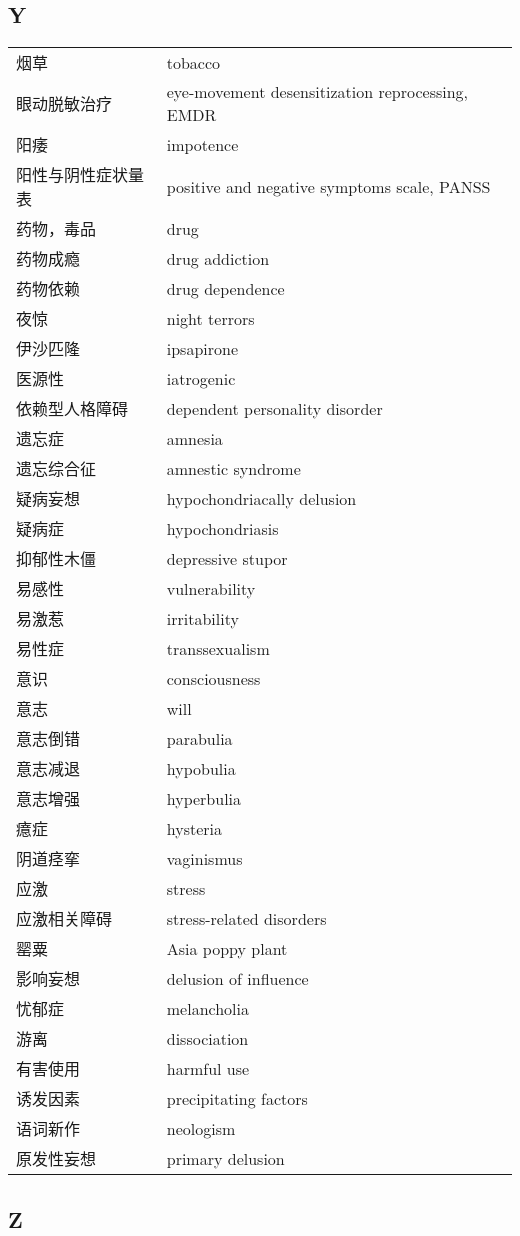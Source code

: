 \subsection*{Y}

\begin{longtable}[]{@{}ll@{}}
\toprule
\endhead
烟草 & tobacco\tabularnewline
眼动脱敏治疗 & eye-movement desensitization reprocessing,
EMDR\tabularnewline
阳痿 & impotence\tabularnewline
阳性与阴性症状量表 & positive and negative symptoms scale,
PANSS\tabularnewline
药物，毒品 & drug\tabularnewline
药物成瘾 & drug addiction\tabularnewline
药物依赖 & drug dependence\tabularnewline
夜惊 & night terrors\tabularnewline
伊沙匹隆 & ipsapirone\tabularnewline
医源性 & iatrogenic\tabularnewline
依赖型人格障碍 & dependent personality disorder\tabularnewline
遗忘症 & amnesia\tabularnewline
遗忘综合征 & amnestic syndrome\tabularnewline
疑病妄想 & hypochondriacally delusion\tabularnewline
疑病症 & hypochondriasis\tabularnewline
抑郁性木僵 & depressive stupor\tabularnewline
易感性 & vulnerability\tabularnewline
易激惹 & irritability\tabularnewline
易性症 & transsexualism\tabularnewline
意识 & consciousness\tabularnewline
意志 & will\tabularnewline
意志倒错 & parabulia\tabularnewline
意志减退 & hypobulia\tabularnewline
意志增强 & hyperbulia\tabularnewline
癔症 & hysteria\tabularnewline
阴道痉挛 & vaginismus\tabularnewline
应激 & stress\tabularnewline
应激相关障碍 & stress-related disorders\tabularnewline
罂粟 & Asia poppy plant\tabularnewline
影响妄想 & delusion of influence\tabularnewline
忧郁症 & melancholia\tabularnewline
游离 & dissociation\tabularnewline
有害使用 & harmful use\tabularnewline
诱发因素 & precipitating factors\tabularnewline
语词新作 & neologism\tabularnewline
原发性妄想 & primary delusion\tabularnewline
\bottomrule
\end{longtable}

\subsection*{Z}

